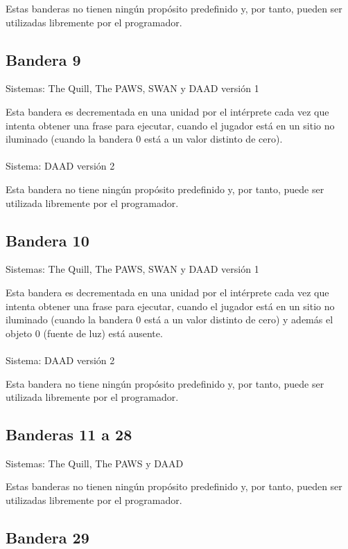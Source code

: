 \documentclass[11pt, a5paper]{article}
\newcommand{\quill}{\textsf{The Quill}\xspace}
\newcommand{\paw}{\textsf{The PAWS}\xspace}
\newcommand{\swan}{\textsf{SWAN}\xspace}
\newcommand{\daad}{\textsf{DAAD}\xspace}
\newcommand{\sistema}[1]{\noindent Sistema: #1 \nopagebreak}
\newcommand{\sistemas}[1]{\noindent Sistemas: #1 \nopagebreak}
\begin{document}
Estas banderas no tienen ningún propósito predefinido y, por tanto, pueden ser utilizadas libremente por el programador.

\subsection{Bandera 9}

\sistemas{\quill, \paw, \swan y \daad versión 1}

Esta bandera es decrementada en una unidad por el intérprete cada vez que intenta obtener una frase para ejecutar, cuando el jugador está en un sitio no iluminado (cuando la bandera 0 está a un valor distinto de cero).
\\\ \\
\sistema{\daad versión 2}

Esta bandera no tiene ningún propósito predefinido y, por tanto, puede ser utilizada libremente por el programador.

\subsection{Bandera 10}

\sistemas{\quill, \paw, \swan y \daad versión 1}

Esta bandera es decrementada en una unidad por el intérprete cada vez que intenta obtener una frase para ejecutar, cuando el jugador está en un sitio no iluminado (cuando la bandera 0 está a un valor distinto de cero) y además el objeto 0 (fuente de luz) está ausente.
\\\ \\
\sistema{\daad versión 2}

Esta bandera no tiene ningún propósito predefinido y, por tanto, puede ser utilizada libremente por el programador.

\subsection{Banderas 11 a 28}

\sistemas{\quill, \paw y \daad}

Estas banderas no tienen ningún propósito predefinido y, por tanto, pueden ser utilizadas libremente por el programador.

\subsection{Bandera 29}\label{flag29}
\end{document}
